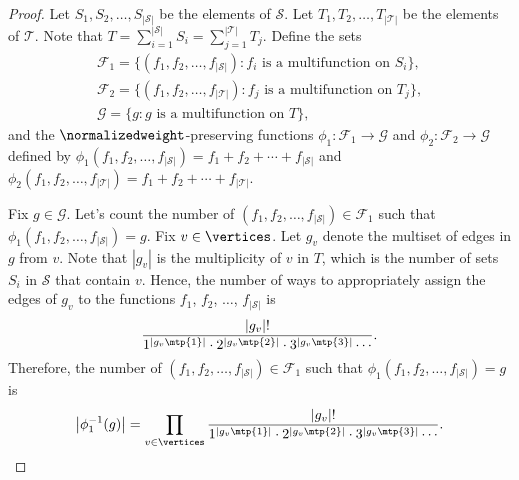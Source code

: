 \begin{proof}
    Let \(S_1, S_2, \dots, S_{|\mathcal{S}|}\) be the elements of \(\mathcal{S}\).
    Let \(T_1, T_2, \dots, T_{|\mathcal{T}|}\) be the elements of \(\mathcal{T}\).
    Note that \(T = \sum_{i=1}^{|\mathcal{S}|} S_i = \sum_{j=1}^{|\mathcal{T}|} T_j\).
    Define the sets
    \begin{gather*}
        \mathcal{F}_1 = \{ (f_1, f_2, \dots, f_{|\mathcal{S}|}) : f_i \text{ is a multifunction on } S_i \}, \\
        \mathcal{F}_2 = \{ (f_1, f_2, \dots, f_{|\mathcal{T}|}) : f_j \text{ is a multifunction on } T_j \}, \\
        \mathcal{G} = \{ g : g \text{ is a multifunction on } T \},
    \end{gather*}
    and the \(\normalizedweight\)-preserving functions
    \( \phi_1 \colon \mathcal{F}_1 \to \mathcal{G} \) and
    \( \phi_2 \colon \mathcal{F}_2 \to \mathcal{G} \)
    defined by \(\phi_1(f_1, f_2, \dots, f_{|\mathcal{S}|}) = f_1 + f_2 + \cdots + f_{|\mathcal{S}|}\) and \(\phi_2(f_1, f_2, \dots, f_{|\mathcal{T}|}) = f_1 + f_2 + \cdots + f_{|\mathcal{T}|}\).

    Fix \(g \in \mathcal{G}\).
    Let's count the number of \((f_1, f_2, \dots, f_{|\mathcal{S}|}) \in \mathcal{F}_1\) such that \(\phi_1(f_1, f_2, \dots, f_{|\mathcal{S}|}) = g\).
    Fix \(v \in \vertices\).
    Let \(g_v\) denote the multiset of edges in \(g\) from \(v\).
    Note that \(|g_v|\) is the multiplicity of \(v\) in \(T\),
    which is the number of sets \(S_i\) in \(\mathcal{S}\) that contain \(v\).
    Hence, the number of ways to appropriately assign the edges of \(g_v\) to the functions \(f_1\), \(f_2\), \(\dots\), \(f_{|\mathcal{S}|}\) is
    \begin{equation*}
        \frac{|g_v|!}{1^{\left| g_v\mtp{1} \right|} \cdot 2^{\left| g_v\mtp{2} \right|} \cdot 3^{\left| g_v\mtp{3} \right|} \cdots}.
    \end{equation*}
    Therefore, the number of \((f_1, f_2, \dots, f_{|\mathcal{S}|}) \in \mathcal{F}_1\) such that \(\phi_1(f_1, f_2, \dots, f_{|\mathcal{S}|}) = g\) is
    \begin{equation*}
        \left| \phi_1^{-1}(g) \right| =
        \prod_{v \in \vertices} \frac{\left| g_v \right|!}{1^{\left| g_v\mtp{1} \right|} \cdot 2^{\left| g_v\mtp{2} \right|} \cdot 3^{\left| g_v\mtp{3} \right|} \cdots}.
    \end{equation*}


\end{proof}
